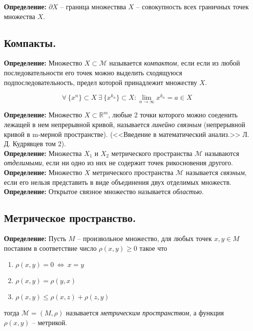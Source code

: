 \documentclass[a4paper,12pt]{article} %
\begin{document}
\noindent \textbf{Определение:} $\partial X$ -- граница множествва $X$ -- совокупность всех граничных точек множества $X$.\\

\subsection*{Компакты.}

\noindent \textbf{Определение:} Множество $X \subset \mathscr{M}$ называется \textit{компактом}, если если из любой последовательности его точек можно выделить сходящуюся подпоследовательность, предел которой принадлежит множеству $X$.

\[ \forall ~ \{x^n \} \subset X ~ \exists ~ \{x^{k_n} \} \subset X : \lim_{n \to \infty} x^{k_n} = a \in X \]

\noindent \textbf{Определение:} Множество $X \subset \mathbb{R}^m$, любые 2 точки которого можно соеденить лежащей в нем непрерывной кривой, называется \textit{линейно связным} (непрерывной кривой в m-мерной пространстве). (<<Введение в математический анализ.>> Л. Д. Кудрявцев том 2).\\

\noindent \textbf{Определение:} Множества $X_1$ и $X_2$ метрического пространства $\mathscr{M}$ называются \textit{отделимыми}, если ни одно из них не содержит точек рикосновения другого.\\

\noindent \textbf{Определение:} Множество $X$ метрического пространства $\mathscr{M}$ называется \textit{связным}, если его нельзя представить в виде объединения двух отделимых множеств.\\

\noindent \textbf{Определение:} Открытое связное множество называется \textit{областью}.

\subsection*{Метрическое пространство.}

\noindent \textbf{Определение:} Пусть $M$ -- произвольное множество, для любых точек $x, y \in M$ поставим в соответствие число $\rho(x, y) \geqslant 0$ такое что
\begin{enumerate}
    \item $\rho(x, y) = 0 ~ \Leftrightarrow ~ x = y$
    \item $\rho(x, y) = \rho(y, x)$
    \item $\rho(x, y) \leqslant \rho(x, z) + \rho(z, y)$
\end{enumerate}
\noindent тогда $\mathscr{M} = (M, \rho)$ называется \textit{метрическим пространством}, а функция $\rho(x, y)$ -- метрикой.\\
\end{document}
